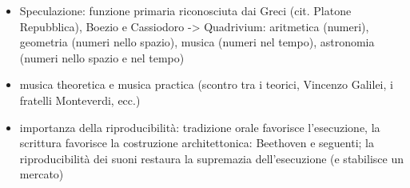 \documentclass[mode=\printmode,compress,xcolor=dvipsnames]{beamer}
\begin{document}
\begin{itemize}

        \item Speculazione: funzione primaria riconosciuta dai Greci (cit. Platone
              Repubblica), Boezio e Cassiodoro -> Quadrivium: aritmetica (numeri),
              geometria (numeri nello spazio), musica (numeri nel tempo), astronomia
              (numeri nello spazio e nel tempo)
        \item musica theoretica e musica practica (scontro tra i teorici,
                Vincenzo Galilei, i fratelli Monteverdi, ecc.)
        \item importanza della riproducibilit\`a: tradizione orale favorisce l'esecuzione, la scrittura favorisce la costruzione
                architettonica: Beethoven e seguenti; la riproducibilit\`a dei
                suoni restaura la supremazia dell'esecuzione (e stabilisce un
                mercato)


\end{itemize}
\end{document}
